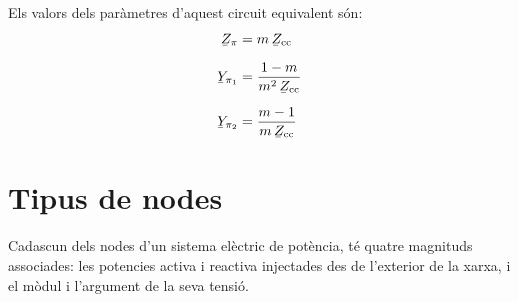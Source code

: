 Els valors dels par\`{a}metres d'aquest circuit equivalent s\'{o}n:
\begin{align}
   \cmplx{Z}_\pi &= m \, \cmplx{Z}\ped{cc} \\[1.5ex]
   \cmplx{Y}_{\pi_1} &= \frac{1-m}{m^2 \,\cmplx{Z}\ped{cc}} \\[1.5ex]
   \cmplx{Y}_{\pi_2} &= \frac{m-1}{m\, \cmplx{Z}\ped{cc}}
\end{align}

\section{Tipus de nodes} 

Cadascun dels nodes d'un sistema el\`{e}ctric de pot\`{e}ncia, t\'{e} quatre
magnituds associades: les potencies activa i reactiva injectades des
de l'exterior de la xarxa, i el m\`{o}dul i l'argument de la seva
tensi\'{o}.

